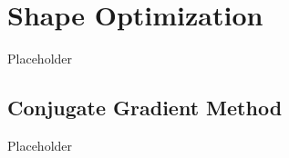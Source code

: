\section{Shape Optimization}
\label{sec:bg:opt}

Placeholder

\subsection{Conjugate Gradient Method}
\label{sec:bg:opt:conjgrad}

Placeholder
